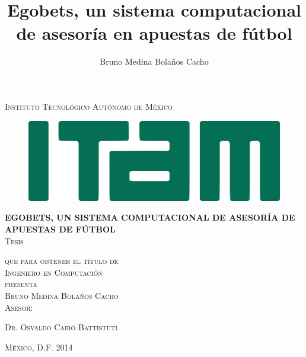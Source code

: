 
\title{Egobets, un sistema computacional de asesoría en apuestas de fútbol}
\author{Bruno Medina Bolaños Cacho}

\begin{titlepage}
\begin{center}

\textsc{\Large Instituto Tecnológico Autónomo de México}\\[3em]

\begin{figure}[ht]
\begin{center}
\includegraphics{resources/logo-ITAM}
\end{center}
\end{figure}

\vspace{2em}

\textsc\huge\textbf{EGOBETS, UN SISTEMA COMPUTACIONAL DE ASESORÍA DE APUESTAS DE FÚTBOL}\\[3em]


\textsc{\large Tesis}

\textsc{que para obtener el título de}\\[1em]

\textsc{Ingeniero en Computación}\\[1em]

\textsc{presenta}\\[1em]

\textsc{\Large Bruno Medina Bolaños Cacho}\\[1em]

\textsc{\large Asesor:}

 \textsc{\large Dr. Osvaldo Cairó Battistuti}\\[1em]


\end{center}

\vspace*{\fill}
\textsc{México, D.F. \hspace*{\fill} 2014}

\end{titlepage}

